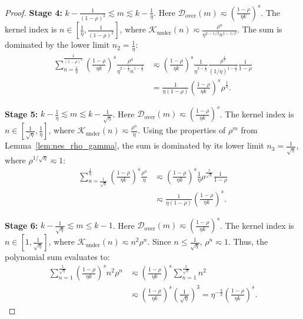 \begin{proof}
\textbf{Stage 4:} $k - \frac{1}{(1-\rho)^2} \lesssim m \lesssim k - \frac{1}{\eta}$. 
Here $\mathcal{D}_{\mathrm{over}}(m) \eqsim \left(\frac{1-\rho}{\eta k}\right)^s$. The kernel index is $n \in \left[ \frac{1}{\eta}, \frac{1}{(1-\rho)^2} \right]$, where $\mathcal{K}_{\mathrm{under}}(n) \eqsim \frac{\rho^n}{\eta^{2-1/\beta} n^{1-1/\beta}}$. The sum is dominated by the lower limit $n_2 = \frac{1}{\eta}$:
\begin{align*}
    \sum_{n=\frac{1}{\eta}}^{\frac{1}{(1-\rho)^2}} \left(\frac{1-\rho}{\eta k}\right)^s \frac{\rho^n}{\eta^{2-\frac{1}{\beta}} n^{1-\frac{1}{\beta}}} 
    &\eqsim \left(\frac{1-\rho}{\eta k}\right)^s \frac{1}{\eta^{2-\frac{1}{\beta}}} \frac{\rho^{\frac{1}{\eta}}}{(1/\eta)^{1-\frac{1}{\beta}}} \frac{1}{1-\rho} \\
    &= \frac{1}{\eta(1-\rho)} \left(\frac{1-\rho}{\eta k}\right)^s \rho^{\frac{1}{\eta}}.
\end{align*}

\textbf{Stage 5:} $k - \frac{1}{\eta} \lesssim m \lesssim k - \frac{1}{\sqrt{\eta}}$. 
Here $\mathcal{D}_{\mathrm{over}}(m) \eqsim \left(\frac{1-\rho}{\eta k}\right)^s$. The kernel index is $n \in \left[ \frac{1}{\sqrt{\eta}}, \frac{1}{\eta} \right]$, where $\mathcal{K}_{\mathrm{under}}(n) \eqsim \frac{\rho^n}{\eta}$. Using the properties of $\rho^m$ from Lemma~\ref{lem:nes_rho_gamma}, the sum is dominated by its lower limit $n_3 = \frac{1}{\sqrt{\eta}}$, where $\rho^{1/\sqrt{\eta}} \eqsim 1$:
\begin{align*}
    \sum_{n=\frac{1}{\sqrt{\eta}}}^{\frac{1}{\eta}} \left(\frac{1-\rho}{\eta k}\right)^s \frac{\rho^n}{\eta} 
    &\eqsim \left(\frac{1-\rho}{\eta k}\right)^s \frac{1}{\eta} \rho^{\frac{1}{\sqrt{\eta}}} \frac{1}{1-\rho} \\
    &\eqsim \frac{1}{\eta(1-\rho)} \left(\frac{1-\rho}{\eta k}\right)^s.
\end{align*}

\textbf{Stage 6:} $k - \frac{1}{\sqrt{\eta}} \lesssim m \le k - 1$. 
Here $\mathcal{D}_{\mathrm{over}}(m) \eqsim \left(\frac{1-\rho}{\eta k}\right)^s$. The kernel index is $n \in \left[ 1, \frac{1}{\sqrt{\eta}} \right]$, where $\mathcal{K}_{\mathrm{under}}(n) \eqsim n^2 \rho^n$. Since $n \le \frac{1}{\sqrt{\eta}}$, $\rho^n \eqsim 1$. Thus, the polynomial sum evaluates to:
\begin{align*}
    \sum_{n=1}^{\frac{1}{\sqrt{\eta}}} \left(\frac{1-\rho}{\eta k}\right)^s n^2 \rho^n 
    &\eqsim \left(\frac{1-\rho}{\eta k}\right)^s \sum_{n=1}^{\frac{1}{\sqrt{\eta}}} n^2 \\
    &\eqsim \left(\frac{1-\rho}{\eta k}\right)^s \left(\frac{1}{\sqrt{\eta}}\right)^3 = \eta^{-\frac{3}{2}} \left(\frac{1-\rho}{\eta k}\right)^s.
\end{align*}


\end{proof}
